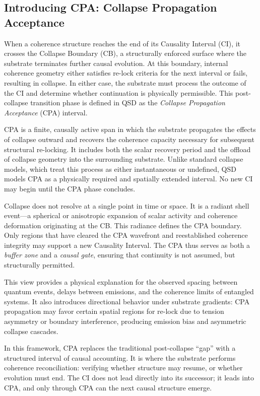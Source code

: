 \documentclass[preprints,article,submit,pdftex,moreauthors]{Definitions/mdpi}
\begin{document}
\subsection{Introducing CPA: Collapse Propagation Acceptance}

When a coherence structure reaches the end of its Causality Interval (CI), it crosses the Collapse Boundary (CB), a structurally enforced surface where the substrate terminates further causal evolution. At this boundary, internal coherence geometry either satisfies re-lock criteria for the next interval or fails, resulting in collapse. In either case, the substrate must process the outcome of the CI and determine whether continuation is physically permissible. This post-collapse transition phase is defined in QSD as the \emph{Collapse Propagation Acceptance} (CPA) interval.

CPA is a finite, causally active span in which the substrate propagates the effects of collapse outward and recovers the coherence capacity necessary for subsequent structural re-locking. It includes both the scalar recovery period and the offload of collapse geometry into the surrounding substrate. Unlike standard collapse models, which treat this process as either instantaneous or undefined, QSD models CPA as a physically required and spatially extended interval. No new CI may begin until the CPA phase concludes.

Collapse does not resolve at a single point in time or space. It is a radiant shell event---a spherical or anisotropic expansion of scalar activity and coherence deformation originating at the CB. This radiance defines the CPA boundary. Only regions that have cleared the CPA wavefront and reestablished coherence integrity may support a new Causality Interval. The CPA thus serves as both a \emph{buffer zone} and a \emph{causal gate}, ensuring that continuity is not assumed, but structurally permitted.

This view provides a physical explanation for the observed spacing between quantum events, delays between emissions, and the coherence limits of entangled systems. It also introduces directional behavior under substrate gradients: CPA propagation may favor certain spatial regions for re-lock due to tension asymmetry or boundary interference, producing emission bias and asymmetric collapse cascades.

In this framework, CPA replaces the traditional post-collapse “gap” with a structured interval of causal accounting. It is where the substrate performs coherence reconciliation: verifying whether structure may resume, or whether evolution must end. The CI does not lead directly into its successor; it leads into CPA, and only through CPA can the next causal structure emerge.
\end{document}
